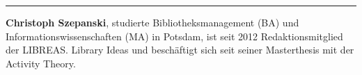 \begin{center}\rule{0.5\linewidth}{\linethickness}\end{center}

\textbf{Christoph Szepanski}, studierte Bibliotheksmanagement (BA) und
Informationswissenschaften (MA) in Potsdam, ist seit 2012
Redaktionsmitglied der LIBREAS. Library Ideas und beschäftigt sich seit
seiner Masterthesis mit der Activity Theory.
